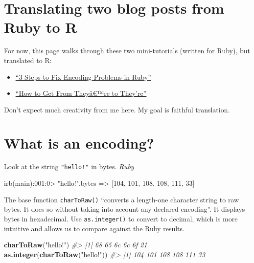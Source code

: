 \documentclass[
]{book}
\newenvironment{Shaded}{\begin{snugshade}}{\end{snugshade}}
\newcommand{\CommentTok}[1]{\textcolor[rgb]{0.56,0.35,0.01}{\textit{#1}}}
\newcommand{\DecValTok}[1]{\textcolor[rgb]{0.00,0.00,0.81}{#1}}
\newcommand{\KeywordTok}[1]{\textcolor[rgb]{0.13,0.29,0.53}{\textbf{#1}}}
\newcommand{\NormalTok}[1]{#1}
\newcommand{\StringTok}[1]{\textcolor[rgb]{0.31,0.60,0.02}{#1}}
\providecommand{\tightlist}{%
  \setlength{\itemsep}{0pt}\setlength{\parskip}{0pt}}
\begin{document}
\hypertarget{translating-two-blog-posts-from-ruby-to-r}{%
\section{Translating two blog posts from Ruby to R}\label{translating-two-blog-posts-from-ruby-to-r}}

For now, this page walks through these two mini-tutorials (written for Ruby), but translated to R:

\begin{itemize}
\tightlist
\item
  \href{https://www.justinweiss.com/articles/3-steps-to-fix-encoding-problems-in-ruby/}{``3 Steps to Fix Encoding Problems in Ruby''}
\item
  \href{https://www.justinweiss.com/articles/how-to-get-from-theyre-to-theyre/}{``How to Get From Theyâ€™re to They're''}
\end{itemize}

Don't expect much creativity from me here. My goal is faithful translation.

\hypertarget{what-is-an-encoding}{%
\section{What is an encoding?}\label{what-is-an-encoding}}

Look at the string \texttt{"hello!"} in bytes. \emph{Ruby}

\begin{Shaded}
\begin{Highlighting}[]
\NormalTok{irb(main):}\DecValTok{001}\NormalTok{:}\DecValTok{0}\NormalTok{> }\StringTok{"hello!"}\NormalTok{.bytes}
\NormalTok{=> [}\DecValTok{104}\NormalTok{, }\DecValTok{101}\NormalTok{, }\DecValTok{108}\NormalTok{, }\DecValTok{108}\NormalTok{, }\DecValTok{111}\NormalTok{, }\DecValTok{33}\NormalTok{]}
\end{Highlighting}
\end{Shaded}

The base function \texttt{charToRaw()} ``converts a length-one character string to raw bytes. It does so without taking into account any declared encoding''. It displays bytes in hexadecimal. Use \texttt{as.integer()} to convert to decimal, which is more intuitive and allows us to compare against the Ruby results.

\begin{Shaded}
\begin{Highlighting}[]
\KeywordTok{charToRaw}\NormalTok{(}\StringTok{"hello!"}\NormalTok{)}
\CommentTok{#> [1] 68 65 6c 6c 6f 21}
\KeywordTok{as.integer}\NormalTok{(}\KeywordTok{charToRaw}\NormalTok{(}\StringTok{"hello!"}\NormalTok{))}
\CommentTok{#> [1] 104 101 108 108 111  33}
\end{Highlighting}
\end{Shaded}
\end{document}
